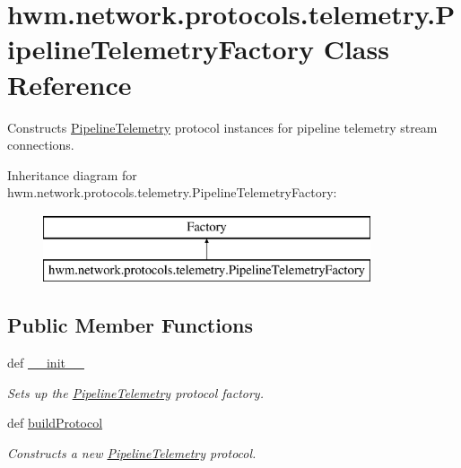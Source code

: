 \hypertarget{classhwm_1_1network_1_1protocols_1_1telemetry_1_1_pipeline_telemetry_factory}{\section{hwm.\-network.\-protocols.\-telemetry.\-Pipeline\-Telemetry\-Factory Class Reference}
\label{classhwm_1_1network_1_1protocols_1_1telemetry_1_1_pipeline_telemetry_factory}
}


Constructs \hyperlink{classhwm_1_1network_1_1protocols_1_1telemetry_1_1_pipeline_telemetry}{Pipeline\-Telemetry} protocol instances for pipeline telemetry stream connections.  


Inheritance diagram for hwm.\-network.\-protocols.\-telemetry.\-Pipeline\-Telemetry\-Factory\-:\begin{figure}[H]
\begin{center}
\leavevmode
\includegraphics[height=2.000000cm]{classhwm_1_1network_1_1protocols_1_1telemetry_1_1_pipeline_telemetry_factory}
\end{center}
\end{figure}
\subsection*{Public Member Functions}
\begin{DoxyCompactItemize}
\item 
def \hyperlink{classhwm_1_1network_1_1protocols_1_1telemetry_1_1_pipeline_telemetry_factory_a808d7e8b76640b36ed8497daf59dd442}{\-\_\-\-\_\-init\-\_\-\-\_\-}
\begin{DoxyCompactList}\small\item\em Sets up the \hyperlink{classhwm_1_1network_1_1protocols_1_1telemetry_1_1_pipeline_telemetry}{Pipeline\-Telemetry} protocol factory. \end{DoxyCompactList}\item 
def \hyperlink{classhwm_1_1network_1_1protocols_1_1telemetry_1_1_pipeline_telemetry_factory_a07d74f2d0f205706e8d5f54083f13e25}{build\-Protocol}
\begin{DoxyCompactList}\small\item\em Constructs a new \hyperlink{classhwm_1_1network_1_1protocols_1_1telemetry_1_1_pipeline_telemetry}{Pipeline\-Telemetry} protocol. \end{DoxyCompactList}\end{DoxyCompactItemize}
